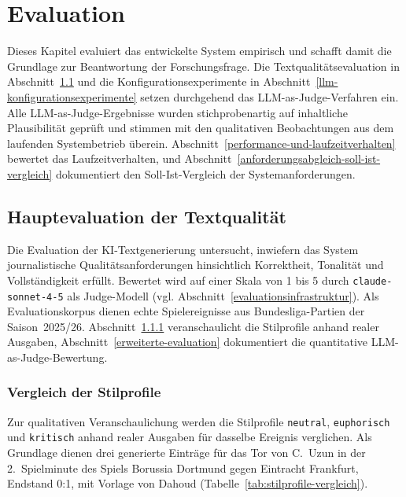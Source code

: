 \chapter{Evaluation}\label{evaluation}

Dieses Kapitel evaluiert das entwickelte System empirisch und schafft damit die Grundlage zur Beantwortung der Forschungsfrage. Die Textqualitätsevaluation in Abschnitt~\ref{evaluation-der-ki-textgenerierung} und die Konfigurationsexperimente in Abschnitt~\ref{llm-konfigurationsexperimente} setzen durchgehend das LLM-as-Judge-Verfahren ein. Alle LLM-as-Judge-Ergebnisse wurden stichprobenartig auf inhaltliche Plausibilität geprüft und stimmen mit den qualitativen Beobachtungen aus dem laufenden Systembetrieb überein. Abschnitt~\ref{performance-und-laufzeitverhalten} bewertet das Laufzeitverhalten, und Abschnitt~\ref{anforderungsabgleich-soll-ist-vergleich} dokumentiert den Soll-Ist-Vergleich der Systemanforderungen.


\section{Hauptevaluation der Textqualität}\label{evaluation-der-ki-textgenerierung}

Die Evaluation der KI-Textgenerierung untersucht, inwiefern das System journalistische Qualitätsanforderungen hinsichtlich Korrektheit, Tonalität und Vollständigkeit erfüllt. Bewertet wird auf einer Skala von 1 bis 5 durch \texttt{claude-sonnet-4-5} als Judge-Modell (vgl. Abschnitt~\ref{evaluationsinfrastruktur}). Als Evaluationskorpus dienen echte Spielereignisse aus Bundesliga-Partien der Saison~2025/26. Abschnitt~\ref{einfluss-der-stilprofile} veranschaulicht die Stilprofile anhand realer Ausgaben, Abschnitt~\ref{erweiterte-evaluation} dokumentiert die quantitative LLM-as-Judge-Bewertung.

\subsection{Vergleich der Stilprofile}\label{einfluss-der-stilprofile}

Zur qualitativen Veranschaulichung werden die Stilprofile \texttt{neutral}, \texttt{euphorisch} und \texttt{kritisch} anhand realer Ausgaben für dasselbe Ereignis verglichen. Als Grundlage dienen drei generierte Einträge für das Tor von C.~Uzun in der 2.~Spielminute des Spiels Borussia Dortmund gegen Eintracht Frankfurt, Endstand 0:1, mit Vorlage von Dahoud (Tabelle~\ref{tab:stilprofile-vergleich}).


